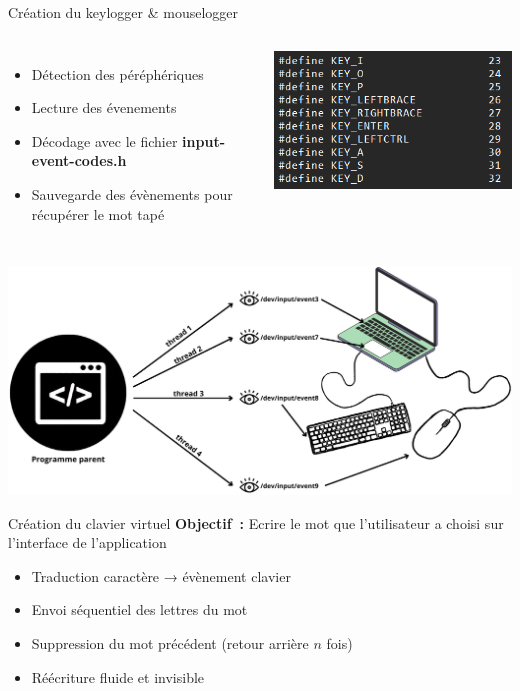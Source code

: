 \begin{frame}{Création du keylogger \& mouselogger}
	\vspace*{-0.5cm}
	\begin{columns}
		\begin{itemize}
			\item Détection des péréphériques
			\item Lecture des évenements
			\item Décodage avec le fichier \textbf{input-event-codes.h}
			\item Sauvegarde des évènements pour récupérer le mot tapé
		\end{itemize}
		\includegraphics[width=\textwidth]{images/fichier_touche.png}
	\end{columns}
	\begin{center}
		\vspace*{-0.3cm}
		\includegraphics[width=\textwidth]{images/lecture-fichier-borderless.png}
	\end{center}

\end{frame}



\begin{frame}{Création du clavier virtuel}
	\textbf{Objectif~:} Ecrire le mot que l'utilisateur a choisi sur l'interface de l'application
	\begin{itemize}
		\item Traduction caractère → évènement clavier
		\item Envoi séquentiel des lettres du mot
		\item Suppression du mot précédent (retour arrière $n$ fois)
		\item Réécriture fluide et invisible
	\end{itemize}
\end{frame}


